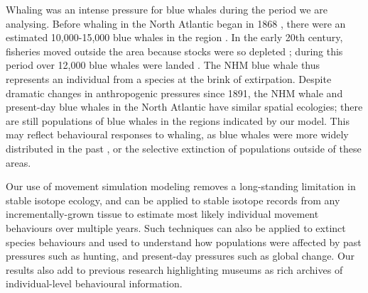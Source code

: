 \documentclass[9pt,twocolumn,twoside,lineno]{pnas-new}
\begin{document}
Whaling was an intense pressure for blue whales during the period we are analysing. 
Before whaling in the North Atlantic began in 1868 \cite{reilly2008balaenoptera}, there were an estimated 10,000-15,000 blue whales in the region \cite{sigurjonsson1995life}. 
In the early 20th century, fisheries moved outside the area because stocks were so depleted \cite{reilly2008balaenoptera}; during this period over 12,000 blue whales were landed \cite{sigurjonsson1995life}. 
The NHM blue whale thus represents an individual from a species at the brink of extirpation.
Despite dramatic changes in anthropogenic pressures since 1891, the NHM whale and present-day blue whales in the North Atlantic have similar spatial ecologies; there are still populations of blue whales in the regions indicated by our model. This may reflect behavioural responses to whaling, as blue whales were more widely distributed in the past \cite{reeves2004historical}, or the selective extinction of populations outside of these areas.

Our use of movement simulation modeling removes a long-standing limitation in stable isotope ecology, and can be applied to stable isotope records from any incrementally-grown tissue to estimate most likely individual movement behaviours over multiple years. 
Such techniques can also be applied to extinct species behaviours and used to understand how populations were affected by past pressures such as hunting, and present-day pressures such as global change. 
Our results also add to previous research \cite{lister2011natural,ryan2013stable} highlighting museums as rich archives of individual-level behavioural information.
\end{document}
